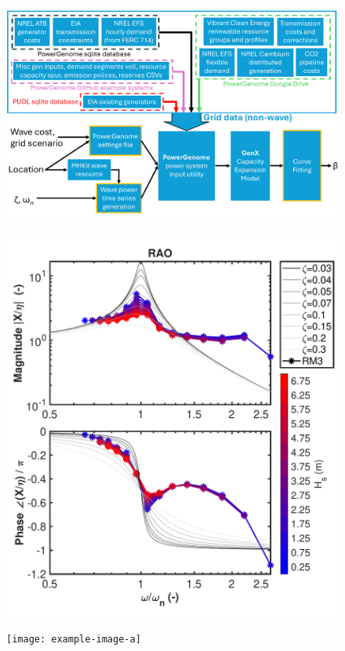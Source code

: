 \documentclass[10pt,twoside]{article}
\begin{document}
\begin{figure}[b]
\noindent
\begin{minipage}[t]{0.32\textwidth}
    \centering
    \includegraphics[width=\linewidth]{figures/PowerGenomeDataFlow.pdf}
    \label{fig:CEM-data-flow}
\end{minipage}
\hfill
\begin{minipage}[t]{0.32\textwidth}
    \centering
    \includegraphics[width=\linewidth]{figures/bode_second_order.pdf}
    \label{fig:bode}
\end{minipage}
\hfill
\begin{minipage}[t]{0.32\textwidth}
    \centering
    \texttt{[image: example-image-a]}
    \label{fig:three}
\end{minipage}
\end{figure}
\end{document}
